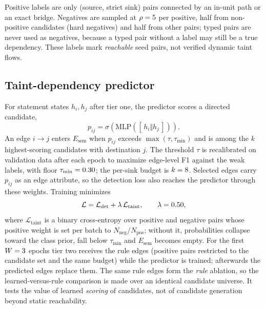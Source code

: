 \documentclass[pdflatex,sn-mathphys-num]{sn-jnl}
\begin{document}
Positive labels are only (source, strict sink) pairs connected by an in-unit
path or an exact bridge. Negatives are sampled at $\rho=5$ per
positive, half from non-positive candidates (hard negatives) and half from
other pairs; typed pairs are never used as negatives, because a typed pair
without a label may still be a true dependency. These labels mark
\emph{reachable} seed pairs, not verified dynamic taint flows.

\subsection{Taint-dependency predictor}\label{sec:taint}
For statement states $h_i,h_j$ after tier one, the predictor scores a directed
candidate,
\begin{equation}
p_{ij}=\sigma\!\left(\mathrm{MLP}([\,h_i \Vert h_j\,])\right).
\end{equation}
An edge $i\rightarrow j$ enters $E_{\text{sem}}$ when $p_{ij}$ exceeds
$\max(\tau,\tau_{\min})$ and is among the $k$ highest-scoring candidates with
destination $j$. The threshold $\tau$ is recalibrated on validation data after
each epoch to maximize edge-level F1 against the weak labels, with floor
$\tau_{\min}=0.30$; the per-sink budget is $k=8$. Selected edges
carry $p_{ij}$ as an edge attribute, so the detection loss also reaches the
predictor through these weights. Training minimizes
\begin{equation}
\mathcal{L}=\mathcal{L}_{\mathrm{det}}+\lambda\,\mathcal{L}_{\mathrm{taint}},
\qquad \lambda=0.50,
\end{equation}
where $\mathcal{L}_{\mathrm{taint}}$ is a binary cross-entropy over positive
and negative pairs whose positive weight is set per batch to
$N_{\text{neg}}/N_{\text{pos}}$; without it, probabilities collapse toward the
class prior, fall below $\tau_{\min}$ and $E_{\text{sem}}$ becomes empty. For
the first $W=3$ epochs tier two receives the rule edges (positive pairs
restricted to the candidate set and the same budget) while the predictor is
trained; afterwards the predicted edges replace them. The same rule edges form
the \emph{rule} ablation, so the learned-versus-rule comparison is made over an
identical candidate universe. It tests the value of learned \emph{scoring} of
candidates, not of candidate generation beyond static reachability.
\end{document}
